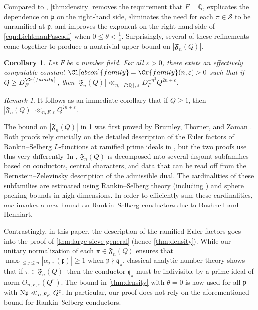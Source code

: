 \documentclass[11pt]{amsart}
\newtheorem{corollary}[theorem]{Corollary}
\theoremstyle{remark}
\newtheorem*{remark}{Remark}
\numberwithin{equation}{section}
\newcommand{\kp}{\mathfrak{p}}
\newcommand{\kq}{\mathfrak{q}}
\newcommand{\N}{\textnormal{N}}
\newcommand{\Q}{\mathbb{Q}}
\renewcommand{\epsilon}{\varepsilon}
\begin{document}
Compared to \cite[Theorem 1]{lichtman2024density}, \cref{thm:density} removes the requirement that $F=\Q$, explicates the dependence on $\kp$ on the right-hand side, eliminates the need for each $\pi\in\mathcal{S}$ to be unramified at $\kp$, and improves the exponent on the right-hand side of \eqref{eqn:LichtmanPascadi} when $0\leq\theta<\frac{1}{4}$.  Surprisingly, several of these refinements come together to produce a nontrivial upper bound on $|\mathfrak{F}_n(Q)|$.

\begin{corollary}
\label{cor:family}
Let $F$ be a number field.  For all $\epsilon>0$, there exists an effectively computable constant $\Cl[abcon]{family}=\Cr{family}(n,\epsilon)>0$ such that if $Q\geq D_F^{\Cr{family}}$, then $|\mathfrak{F}_n(Q)|\ll_{n,[F:\Q],\epsilon}D_F^{-n^2}Q^{2n+\epsilon}$.
\end{corollary}
\begin{remark}
It follows as an immediate corollary that if $Q\geq 1$, then $|\mathfrak{F}_n(Q)|\ll_{n,F,\epsilon}Q^{2n+\epsilon}$.
\end{remark}

The bound on $|\mathfrak{F}_n(Q)|$ in \cref{cor:family} was first proved by Brumley, Thorner, and Zaman \cite[Theorem A.1]{BrumleyThornerZaman}.  Both proofs rely crucially on the detailed description of the Euler factors of Rankin--Selberg $L$-functions at ramified prime ideals in \cite[(A.8)]{soundararajan2019weak}, but the two proofs use this very differently.  In \cite{BrumleyThornerZaman}, $\mathfrak{F}_n(Q)$ is decomposed into several disjoint subfamilies based on conductors, central characters, and data that can be read off from the Bernstein--Zelevinsky description of the admissible dual.  The cardinalities of these subfamilies are estimated using Rankin--Selberg theory (including \cite[(A.8)]{soundararajan2019weak}) and sphere packing bounds in high dimensions.  In order to efficiently sum these cardinalities, one invokes a new bound on Rankin--Selberg conductors \cite[Theorem B.1]{BrumleyThornerZaman} due to Bushnell and Henniart.

Contrastingly, in this paper, the description of the ramified Euler factors goes into the proof of \cref{thm:large-sieve-general} (hence \cref{thm:density}).  While our unitary normalization of each $\pi\in\mathfrak{F}_n(Q)$ ensures that $\max_{1\leq j\leq n}|\alpha_{j,\pi}(\kp)|\geq 1$ when $\kp\nmid\kq_{\pi}$, classical analytic number theory shows that if $\pi\in\mathfrak{F}_n(Q)$, then the conductor $\kq_{\pi}$ must be indivisible by a prime ideal of norm $O_{n,F,\epsilon}(Q^{\epsilon})$. The bound in \cref{thm:density} with $\theta=0$ is now used for all $\kp$ with $\N\kp\ll_{n,F,\epsilon} Q^{\epsilon}$.  In particular, our proof does not rely on the aforementioned bound \cite[Theorem B.1]{BrumleyThornerZaman} for Rankin--Selberg conductors.
\end{document}
